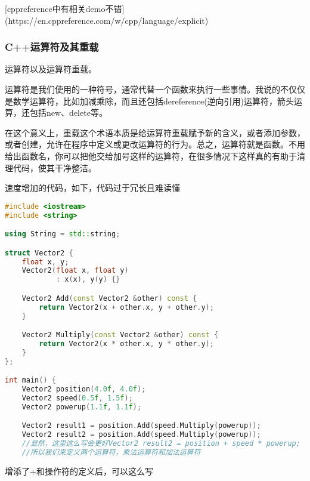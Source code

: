 [cppreference中有相关demo不错](https://en.cppreference.com/w/cpp/language/explicit)

\subsubsection{C++运算符及其重载}

运算符以及运算符重载。

运算符是我们使用的一种符号，通常代替一个函数来执行一些事情。我说的不仅仅是数学运算符，比如加减乘除，而且还包括{\ncodestyle dereference}(逆向引用)运算符，箭头运算，还包括{\ncodestyle new}、{\ncodestyle delete}等。

在这个意义上，重载这个术语本质是给运算符重载赋予新的含义，或者添加参数，或者创建，允许在程序中定义或更改运算符的行为。总之，运算符就是函数。不用给出函数名，你可以把他交给加号这样的运算符，在很多情况下这样真的有助于清理代码，使其干净整洁。

速度增加的代码，如下，代码过于冗长且难读懂

\begin{lstlisting}[language=c++]
#include <iostream>
#include <string>

using String = std::string;

struct Vector2 {
    float x, y;
    Vector2(float x, float y)
            : x(x), y(y) {}

    Vector2 Add(const Vector2 &other) const {
        return Vector2(x + other.x, y + other.y);
    }

    Vector2 Multiply(const Vector2 &other) const {
        return Vector2(x * other.x, y * other.y);
    }
};

int main() {
    Vector2 position(4.0f, 4.0f);
    Vector2 speed(0.5f, 1.5f);
    Vector2 powerup(1.1f, 1.1f);

    Vector2 result1 = position.Add(speed.Multiply(powerup));
    Vector2 result2 = position.Add(speed.Multiply(powerup));
    //显然，这里这么写会更好Vector2 result2 = position + speed * powerup;
    //所以我们来定义两个运算符，乘法运算符和加法运算符
\end{lstlisting}

增添了{\ncodestyle +}和{\ncodestyle *}操作符的定义后，可以这么写

